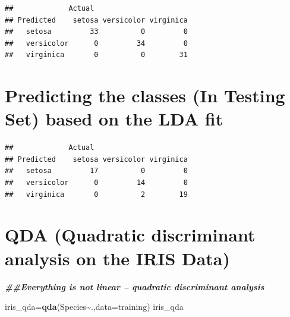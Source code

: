 \documentclass[
]{article}
\newenvironment{Shaded}{\begin{snugshade}}{\end{snugshade}}
\newcommand{\AttributeTok}[1]{\textcolor[rgb]{0.13,0.29,0.53}{#1}}
\newcommand{\DocumentationTok}[1]{\textcolor[rgb]{0.56,0.35,0.01}{\textbf{\textit{#1}}}}
\newcommand{\FunctionTok}[1]{\textcolor[rgb]{0.13,0.29,0.53}{\textbf{#1}}}
\newcommand{\NormalTok}[1]{#1}
\newcommand{\OtherTok}[1]{\textcolor[rgb]{0.56,0.35,0.01}{#1}}
\newcommand{\SpecialCharTok}[1]{\textcolor[rgb]{0.81,0.36,0.00}{\textbf{#1}}}
\begin{document}
\begin{verbatim}
##             Actual
## Predicted    setosa versicolor virginica
##   setosa         33          0         0
##   versicolor      0         34         0
##   virginica       0          0        31
\end{verbatim}

\hypertarget{predicting-the-classes-in-testing-set-based-on-the-lda-fit}{%
\section{Predicting the classes (In Testing Set) based on the LDA
fit}\label{predicting-the-classes-in-testing-set-based-on-the-lda-fit}}

\begin{Shaded}
\end{Shaded}

\begin{verbatim}
##             Actual
## Predicted    setosa versicolor virginica
##   setosa         17          0         0
##   versicolor      0         14         0
##   virginica       0          2        19
\end{verbatim}

\hypertarget{qda-quadratic-discriminant-analysis-on-the-iris-data}{%
\section{QDA (Quadratic discriminant analysis on the IRIS
Data)}\label{qda-quadratic-discriminant-analysis-on-the-iris-data}}

\begin{Shaded}
\begin{Highlighting}[]
\DocumentationTok{\#\#Everything is not linear – quadratic discriminant analysis}

\NormalTok{iris\_qda}\OtherTok{=}\FunctionTok{qda}\NormalTok{(Species}\SpecialCharTok{\textasciitilde{}}\NormalTok{.,}\AttributeTok{data=}\NormalTok{training)}
\NormalTok{iris\_qda}
\end{Highlighting}
\end{Shaded}
\end{document}
